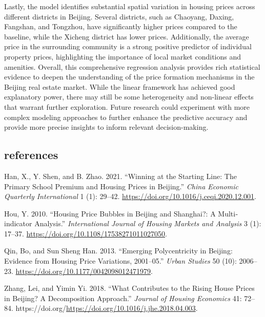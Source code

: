 \documentclass[
  letterpaper,
  DIV=11,
  numbers=noendperiod]{scrartcl}
\newlength{\cslhangindent}
\newenvironment{CSLReferences}[2] %
 {\begin{list}{}{%
  \setlength{\itemindent}{0pt}
  \setlength{\leftmargin}{0pt}
  \setlength{\parsep}{0pt}
  \ifodd #1
   \setlength{\leftmargin}{\cslhangindent}
   \setlength{\itemindent}{-1\cslhangindent}
  \fi
  \setlength{\itemsep}{#2\baselineskip}}}
 {\end{list}}
\begin{document}
Lastly, the model identifies substantial spatial variation in housing
prices across different districts in Beijing. Several districts, such as
Chaoyang, Daxing, Fangshan, and Tongzhou, have significantly higher
prices compared to the baseline, while the Xicheng district has lower
prices. Additionally, the average price in the surrounding community is
a strong positive predictor of individual property prices, highlighting
the importance of local market conditions and amenities. Overall, this
comprehensive regression analysis provides rich statistical evidence to
deepen the understanding of the price formation mechanisms in the
Beijing real estate market. While the linear framework has achieved good
explanatory power, there may still be some heterogeneity and non-linear
effects that warrant further exploration. Future research could
experiment with more complex modeling approaches to further enhance the
predictive accuracy and provide more precise insights to inform relevant
decision-making.

\subsection*{references}\label{references}

\label{refs}
\begin{CSLReferences}{1}{0}
Han, X., Y. Shen, and B. Zhao. 2021. {``Winning at the Starting Line:
The Primary School Premium and Housing Prices in Beijing.''} \emph{China
Economic Quarterly International} 1 (1): 29--42.
\url{https://doi.org/10.1016/j.ceqi.2020.12.001}.

Hou, Y. 2010. {``Housing Price Bubbles in Beijing and Shanghai?: A
Multi‐indicator Analysis.''} \emph{International Journal of Housing
Markets and Analysis} 3 (1): 17--37.
\url{https://doi.org/10.1108/17538271011027050}.

Qin, Bo, and Sun Sheng Han. 2013. {``Emerging Polycentricity in Beijing:
Evidence from Housing Price Variations, 2001--05.''} \emph{Urban
Studies} 50 (10): 2006--23.
\url{https://doi.org/10.1177/0042098012471979}.

Zhang, Lei, and Yimin Yi. 2018. {``What Contributes to the Rising House
Prices in Beijing? A Decomposition Approach.''} \emph{Journal of Housing
Economics} 41: 72--84.
https://doi.org/\url{https://doi.org/10.1016/j.jhe.2018.04.003}.

\end{CSLReferences}
\end{document}
